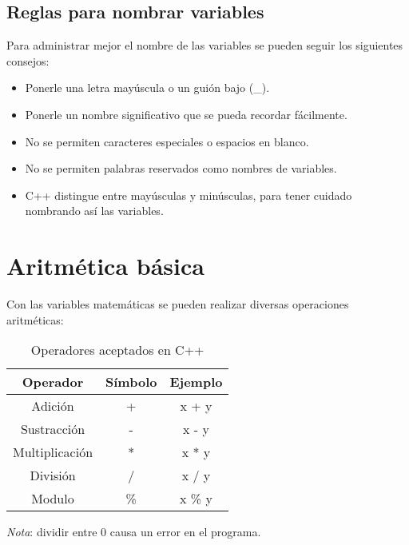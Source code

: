 \subsection{Reglas para nombrar variables}
\hspace{0.55cm}Para administrar mejor el nombre de las variables se pueden seguir los siguientes consejos:
\begin{itemize}
    \item Ponerle una letra mayúscula o un guión bajo (\_).
    \item Ponerle un nombre significativo que se pueda recordar fácilmente.
    \item No se permiten caracteres especiales o espacios en blanco.
    \item No se permiten palabras reservados como nombres de variables.
    \item C++ distingue entre mayúsculas y minúsculas, para tener cuidado nombrando así las variables.
\end{itemize}



\section{Aritmética básica}
\hspace{0.55cm}Con las variables matemáticas se pueden realizar diversas operaciones aritméticas:
\begin{table}[H]
    \begin{center}
        \caption{Operadores aceptados en C++}
        \label{tab: 1}
        \begin{tabular}{c c c}
            \hline
            \textbf{Operador}&\textbf{Símbolo}&\textbf{Ejemplo} \\
            \hline
            Adición         & +     & x + y \\
            Sustracción     & -     & x - y \\
            Multiplicación  & *     & x * y \\
            División        & /     & x / y \\
            Modulo          & \%    & x \% y \\
            \hline
        \end{tabular}
    \end{center}
\end{table}

\textit{Nota}: dividir entre 0 causa un error en el programa.

